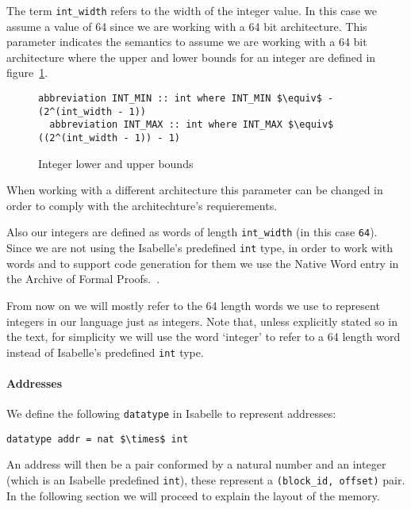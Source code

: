 The term \verb|int_width| refers to the width of the integer value.
In this case we assume a value of 64 since we are working with a 64 bit architecture.
This parameter indicates the semantics to assume we are working with a 64 bit architecture where the upper and lower bounds for an integer are defined in figure~\ref{fig:int_bounds}.

\begin{figure}
  \begin{lstlisting}[frame=single, mathescape=true]
  abbreviation INT_MIN :: int where INT_MIN $\equiv$ - (2^(int_width - 1))
  abbreviation INT_MAX :: int where INT_MAX $\equiv$  ((2^(int_width - 1)) - 1)
  \end{lstlisting}

  \caption{Integer lower and upper bounds}
  \label{fig:int_bounds}
\end{figure}

When working with a different architecture this parameter can be changed in order to comply with the architechture's requierements.

Also our integers are defined as words of length \verb|int_width| (in this case \verb|64|).
Since we are not using the Isabelle's predefined \verb|int| type, in order to work with words and to support code generation for them we use the Native Word entry in the Archive of Formal Proofs.~\parencite{Native_Word-AFP}.

From now on we will mostly refer to the 64 length words we use to represent integers in our language just as integers.
Note that, unless explicitly stated so in the text, for simplicity we will use the word `integer' to refer to a 64 length word instead of Isabelle's predefined \verb|int| type.

\paragraph{Addresses}

We define the following \verb|datatype| in Isabelle to represent addresses:

\begin{lstlisting}[frame=single, mathescape=true]
datatype addr = nat $\times$ int
\end{lstlisting}

An address will then be a pair conformed by a natural number and an integer (which is an Isabelle predefined \verb|int|), these represent a \verb|(block_id, offset)| pair.
In the following section we will proceed to explain the layout of the memory.

